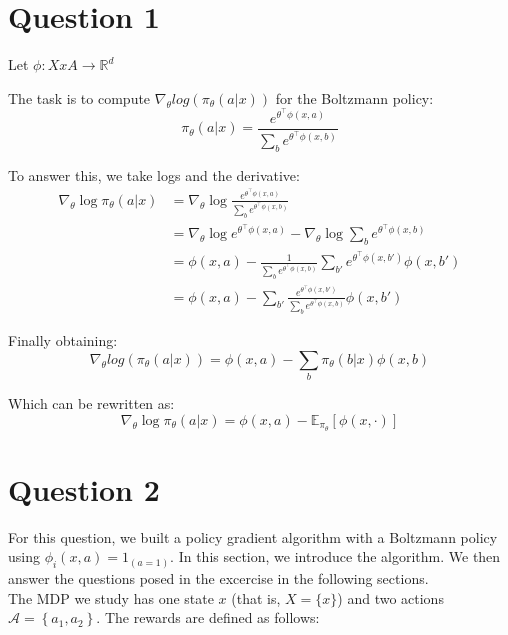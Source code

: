 \documentclass[a4paper, 11pt]{article} %
\begin{document}
\section*{Question 1}

Let $\phi : X x A \rightarrow \mathbb{R}^{d}$

The task is to compute $\nabla_{\theta}log(\pi_{\theta}(a|x))$ for the Boltzmann policy:
\begin{equation}
\pi_{\theta}(a | x)= \frac{e^{\theta^{\top} \phi(x, a)}}{\sum_{b} e^{\theta^{\top} \phi(x, b)}}
\end{equation}

To answer this, we take logs and the derivative:
\begin{align}
\nabla_{\theta} \log \pi_{\theta}(a | x)
&=\nabla_{\theta} \log \frac{e^{\theta^{\top} \phi(x, a)}}{\sum_{b} e^{\theta^{\top} \phi(x, b)}}  \\
&=\nabla_{\theta} \log e^{\theta^{\top} \phi(x, a)}-\nabla_{\theta} \log \sum_{b} e^{\theta^{\top} \phi(x, b)} \\
&=\phi(x, a)-\frac{1}{\sum_{b} e^{\theta^{\top} \phi(x, b)}}\sum_{b'} e^{\theta^{\top} \phi(x, b')} \phi(x, b') \\
& =\phi(x, a)-\sum_{b'} \frac{e^{\theta^{\top} \phi(x, b')} }{\sum_{b} e^{\theta^{\top} \phi (x, b)} } \phi(x, b')
\end{align}

Finally obtaining:
\begin{equation}
\nabla_{\theta}log(\pi_{\theta}(a|x)) = \phi(x, a)-\sum_{b} \pi_{\theta}(b|x) \phi(x, b)
\end{equation}

Which can be rewritten as:
\begin{equation}
\nabla_{\theta} \log \pi_{\theta}(a| x)=\phi(x, a)-\mathbb{E}_{\pi_{\theta}}[\phi(x, \cdot)]
\end{equation}


\section*{Question 2}
For this question, we built a policy gradient algorithm with a Boltzmann policy using $\phi_i(x,a) = 1_{(a=1)}$. In this section, we introduce the algorithm. We then answer the questions posed in the excercise in the following sections. \\

The MDP we study has one state $x$ (that is, $X=\{x\}$) and two actions $\mathcal{A}=\left\{a_{1}, a_{2}\right\}$. The rewards are defined as follows:
\end{document}

